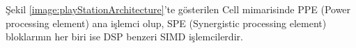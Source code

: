 
Şekil \ref{image:playStationArchitecture}'te gösterilen Cell mimarisinde PPE (Power processing element) ana işlemci olup, SPE (Synergistic processing element) bloklarının her biri ise DSP benzeri SIMD işlemcilerdir.